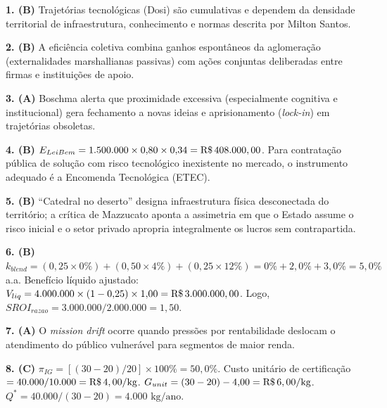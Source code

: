 \clearpage
{}

\begin{boxGabarito}
\textbf{1. (B)} Trajetórias tecnológicas (Dosi) são cumulativas e dependem da densidade territorial de infraestrutura, conhecimento e normas descrita por Milton Santos.

\textbf{2. (B)} A eficiência coletiva combina ganhos espontâneos da aglomeração (externalidades marshallianas passivas) com ações conjuntas deliberadas entre firmas e instituições de apoio.

\textbf{3. (A)} Boschma alerta que proximidade excessiva (especialmente cognitiva e institucional) gera fechamento a novas ideias e aprisionamento (\textit{lock-in}) em trajetórias obsoletas.

\textbf{4. (B)} $E_{LeiBem} = 1.500.000 \times 0{,}80 \times 0{,}34 = \text{R\$\,}{408.000,00}$. Para contratação pública de solução com risco tecnológico inexistente no mercado, o instrumento adequado é a Encomenda Tecnológica (ETEC).

\textbf{5. (B)} ``Catedral no deserto'' designa infraestrutura física desconectada do território; a crítica de Mazzucato aponta a assimetria em que o Estado assume o risco inicial e o setor privado apropria integralmente os lucros sem contrapartida.

\textbf{6. (B)} $k_{blend} = (0{,}25 \times 0\%) + (0{,}50 \times 4\%) + (0{,}25 \times 12\%) = 0\% + 2{,}0\% + 3{,}0\% = 5{,}0\%$ a.a. Benefício líquido ajustado: $V_{liq} = 4.000.000 \times (1 - 0{,}25) \times 1{,}00 = \text{R\$\,}{3.000.000,00}$. Logo, $SROI_{razao} = 3.000.000 / 2.000.000 = 1{,}50$.

\textbf{7. (A)} O \textit{mission drift} ocorre quando pressões por rentabilidade deslocam o atendimento do público vulnerável para segmentos de maior renda.

\textbf{8. (C)} $\pi_{IG} = [(30 - 20)/20] \times 100\% = 50{,}0\%$. Custo unitário de certificação $= 40.000 / 10.000 = \text{R\$\,}{4,00}/\text{kg}$. $G_{unit} = (30 - 20) - 4{,}00 = \text{R\$\,}{6,00}/\text{kg}$. $Q^* = 40.000 / (30 - 20) = 4.000\text{ kg/ano}$.
\end{boxGabarito}

